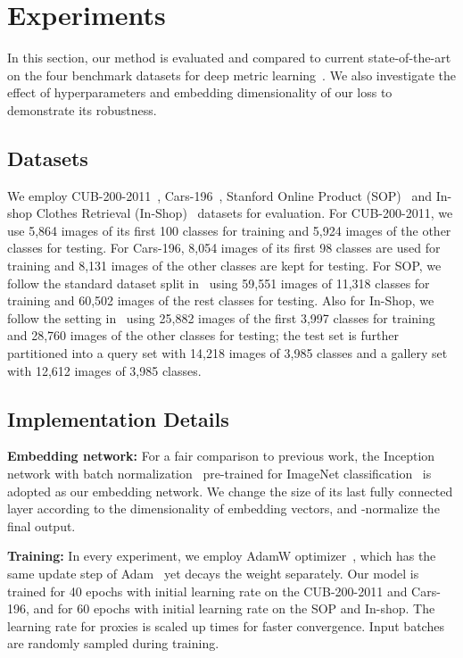 \documentclass[10pt,twocolumn,letterpaper]{article}
\begin{document}
\section{Experiments}
\label{sec:experiments}

In this section, our method is evaluated and compared to current state-of-the-art on the four benchmark datasets for deep metric learning~\cite{CUB200,krause20133d,DeepFashion,songCVPR16}.
We also investigate the effect of hyperparameters and embedding dimensionality of our loss to demonstrate its robustness. 



\subsection{Datasets}
We employ CUB-200-2011~\cite{CUB200}, Cars-196~\cite{krause20133d}, Stanford Online Product (SOP)~\cite{songCVPR16} and In-shop Clothes Retrieval (In-Shop)~\cite{DeepFashion} datasets for evaluation. 
For CUB-200-2011, we use 5,864 images of its first 100 classes for training and 5,924 images of the other classes for testing. 
For Cars-196, 8,054 images of its first 98 classes are used for training and 8,131 images of the other classes are kept for testing.
For SOP, we follow the standard dataset split in~\cite{songCVPR16} using 59,551 images of 11,318 classes for training and 60,502 images of the rest classes for testing.
Also for In-Shop, we follow the setting in~\cite{DeepFashion} using 25,882 images of the first 3,997 classes for training and 28,760 images of the other classes for testing; the test set is further partitioned into a query set with 14,218 images of 3,985 classes and a gallery set with 12,612 images of 3,985 classes. 




\subsection{Implementation Details}
\label{sec:implementation_details}


\noindent \textbf{Embedding network:} For a fair comparison to previous work, the Inception network with batch normalization~\cite{Batchnorm} pre-trained for ImageNet classification~\cite{Imagenet} is adopted as our embedding network.
We change the size of its last fully connected layer according to the dimensionality of embedding vectors, and -normalize the final output.

\vspace{1mm}
\noindent \textbf{Training:} In every experiment, we employ AdamW optimizer~\cite{adamw}, which has the same update step of Adam~\cite{Adamsolver} yet decays the weight separately. 
Our model is trained for 40 epochs with initial learning rate  on the CUB-200-2011 and Cars-196, and for 60 epochs with initial learning rate  on the SOP and In-shop.
The learning rate for proxies is scaled up  times for faster convergence. 
Input batches are randomly sampled during training.
\end{document}
